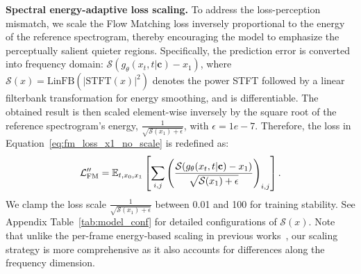 \documentclass{article} %
\begin{document}
\noindent\textbf{Spectral energy-adaptive loss scaling.} To address the loss-perception mismatch, we scale the Flow Matching loss inversely proportional to the energy of the reference spectrogram, thereby encouraging the model to emphasize the perceptually salient quieter regions. Specifically, the prediction error is converted into frequency domain: $\mathcal{S}(g_{\theta}(x_t, t|\mathbf{c}) - x_1)$, where $\mathcal{S}(x)=\mathrm{LinFB}(|\mathrm{STFT}(x)|^2)$ denotes the power STFT followed by a linear filterbank transformation for energy smoothing, and is differentiable. The obtained result is then scaled element-wise inversely by the square root of the reference spectrogram’s energy, $\frac{1}{\sqrt{\mathcal{S}(x_1) + \epsilon}}$, with $\epsilon=1e-7$. Therefore, the loss in Equation~\ref{eq:fm_loss_x1_no_scale} is redefined as:
\begin{equation}
\label{eq:fm_loss_x1_scaling}
\vspace{-0.2em}
\mathcal{L}_{\mathrm{FM}}''
= \mathbb{E}_{t,x_0,x_1} \left[ \sum_{i,j} 
\left(\frac{\mathcal{S}(g_{\theta}(x_t, t|\mathbf{c}) - x_1)}{\sqrt{\mathcal{S}(x_1) + \epsilon}}\right)_{i,j} \right].
\end{equation}
We clamp the loss scale $\frac{1}{\sqrt{\mathcal{S}(x_1) + \epsilon}}$ between 0.01 and 100 for training stability. See Appendix Table~\ref{tab:model_conf} for detailed configurations of $\mathcal{S}(x)$. 
Note that unlike the per-frame energy-based scaling in previous works~\citep{priorgrad,rfwave}, our scaling strategy is more comprehensive as it also accounts for differences along the frequency dimension.


\end{document}
